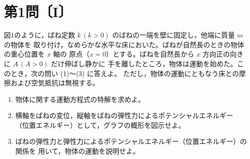 \section*{第1問〔I〕}

図1のように，ばね定数 $k\,(k>0)$ のばねの一端を壁に固定し，他端に質量 $m$ の物体を
取り付け，なめらかな水平な床においた。ばねが自然長のときの物体の重心位置を $x$ 軸の
原点（$x=0$）とする。ばねを自然長から $x$ 方向正の向きに $A\,(A>0)$ だけ伸ばし静かに
手を離したところ，物体は運動を始めた。このとき，次の問い (1)〜(3) に答えよ。
ただし，物体の運動にともなう床との摩擦および空気抵抗は無視する。

\begin{enumerate}[label=(\arabic*)]
  \item 物体に関する運動方程式の特解を求めよ。
  \item 横軸をばねの変位，縦軸をばねの弾性力によるポテンシャルエネルギー
        （位置エネルギー）として，グラフの概形を図示せよ。
  \item ばねの弾性力と弾性力によるポテンシャルエネルギー（位置エネルギー）の関係を
        用いて，物体の運動を説明せよ。
\end{enumerate}

\begin{center}
\end{center}
